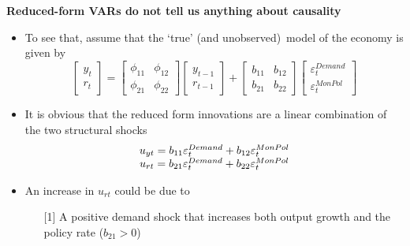 \documentclass[10pt,english,t,aspectratio=169,ignorenonframetext]{beamer}
\begin{document}

\begin{frame}
{\textbf{Reduced-form VARs do not tell us anything about causality}}\vspace{-.25cm}

\begin{itemize}
\item To see that, assume that the `true' (and unobserved)\ model of the
economy is given by%
\begin{equation*}
\begin{bmatrix}
y_{t} \\ 
r_{t}%
\end{bmatrix}%
=\left[ 
\begin{array}{cc}
\phi _{11} & \phi _{12} \\ 
\phi _{21} & \phi _{22}%
\end{array}%
\right] 
\begin{bmatrix}
y_{t-1} \\ 
r_{t-1}%
\end{bmatrix}%
+\left[ 
\begin{array}{cc}
b_{11} & b_{12} \\ 
b_{21} & b_{22}%
\end{array}%
\right] 
\begin{bmatrix}
\varepsilon _{t}^{Demand} \\ 
\varepsilon _{t}^{MonPol}%
\end{bmatrix}%
\end{equation*}

\item It is obvious that the reduced form innovations are a linear
combination of the two structural shocks%
\begin{equation*}
\begin{array}{c}
u_{yt}=b_{11}\varepsilon _{t}^{Demand}+b_{12}\varepsilon _{t}^{MonPol}{%
\mathbf{\medskip }} \\ 
u_{rt}=b_{21}\varepsilon _{t}^{Demand}+b_{22}\varepsilon _{t}^{MonPol}%
\end{array}%
\end{equation*}

\item An increase in $u_{rt}$ could be due to \smallskip

\begin{itemize}
\item[{[1]}] A positive demand shock that increases both output growth and
the policy rate ($b_{21}>0$){\textbf{\medskip }}


\end{itemize}
\end{itemize}
\end{frame}
\end{document}
